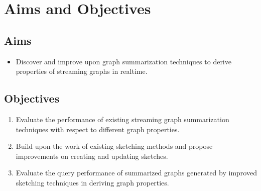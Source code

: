 \chapter{Aims and Objectives}

\section{Aims}

\begin{itemize}
    \item Discover and improve upon graph summarization techniques to derive
        properties of streaming graphs in realtime. 
\end{itemize}

\section{Objectives}

\begin{enumerate}
    \item Evaluate the performance of existing streaming graph summarization 
        techniques with respect to different graph properties. 
    \item Build upon the work of existing sketching methods and propose 
        improvements on creating and updating sketches.
    \item Evaluate the query performance of summarized graphs generated by 
        improved sketching techniques in deriving graph properties.
\end{enumerate}